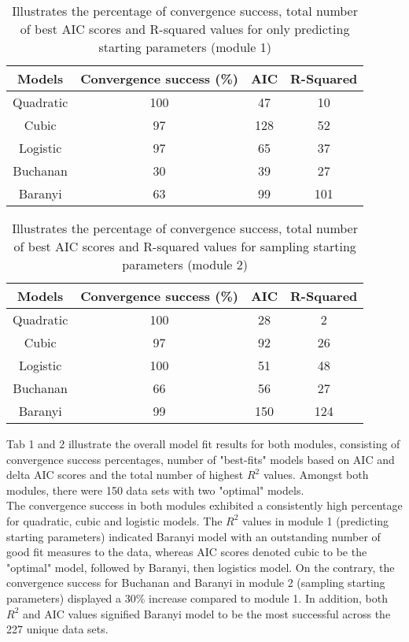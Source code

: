 \documentclass[11pt, a4paper]{article} %
\begin{document}
\begin{table}[h]
    \centering
     \begin{tabular}{||c c c c||} 
     \hline
     Models & Convergence success (\%) & AIC & R-Squared\\ [0.5ex] 
     \hline\hline
     Quadratic & 100 & 47 & 10\\ 
     \hline
     Cubic & 97 & 128 & 52\\
     \hline
     Logistic & 97 & 65 & 37\\
     \hline
     Buchanan & 30 & 39 & 27\\
     \hline
     Baranyi & 63 & 99 & 101\\ [1ex] 
     \hline
    \end{tabular}
    \caption{Illustrates the percentage of convergence success, total number of best AIC scores and R-squared values for only predicting starting parameters (module 1)}
    \label{tab:my_label}
\end{table}

\begin{table}[h]
    \centering
     \begin{tabular}{||c c c c||} 
     \hline
     Models & Convergence success (\%) & AIC & R-Squared\\ [0.5ex] 
     \hline\hline
     Quadratic & 100 & 28 & 2\\ 
     \hline
     Cubic & 97 & 92 & 26\\
     \hline
     Logistic & 100 & 51 & 48\\
     \hline
     Buchanan & 66 & 56 & 27\\
     \hline
     Baranyi & 99 & 150 & 124\\ [1ex] 
     \hline
    \end{tabular}
    \caption{Illustrates the percentage of convergence success, total number of best AIC scores and R-squared values for sampling starting parameters (module 2)}
    \label{tab:my_label}
\end{table}

\noindent Tab 1 and 2 illustrate the overall model fit results for both modules, consisting of convergence success percentages, number of "best-fits" models based on AIC and delta AIC scores and the total number of highest $R^2$ values. Amongst both modules, there were 150 data sets with two "optimal" models. \\

\noindent The convergence success in both modules exhibited a consistently high percentage for quadratic, cubic and logistic models. The $R^2$ values in module 1 (predicting starting parameters) indicated Baranyi model with an outstanding number of good fit measures to the data, whereas AIC scores denoted cubic to be the "optimal" model, followed by Baranyi, then logistics model. On the contrary, the convergence success for Buchanan and Baranyi in module 2 (sampling starting parameters) displayed a 30\% increase compared to module 1. In addition, both $R^2$ and AIC values signified Baranyi model to be the most successful across the 227 unique data sets.\\
\end{document}
